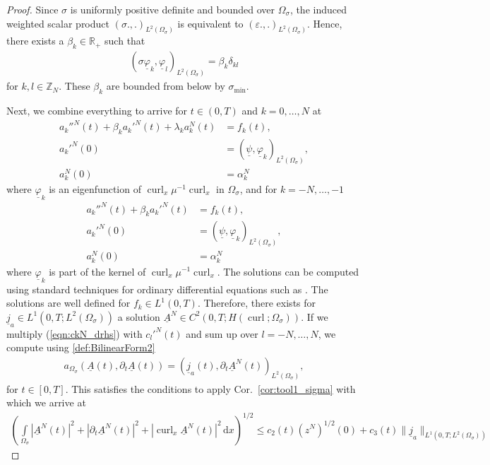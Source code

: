 \documentclass[a4paper,11pt]{article}
\newcommand{\Z}{\mathbb Z}
\newcommand{\R}{\mathbb R}
\newcommand{\omsig}{\Omega_{\sigma}}
\newcommand{\cu}{\operatorname{curl}}
\renewcommand{\vec}[1]{\underline{#1}}
\newcommand{\abs}[1]{\left\lvert{#1}\right\rvert}
\begin{document}
\begin{proof}
	Since $\sigma$ is uniformly positive definite and bounded over $\omsig$, the induced weighted scalar product $(\sigma . ,.)_{L^2(\omsig)}$ is equivalent to $(\varepsilon . ,.)_{L^2(\omsig)}$. Hence, there exists a $\beta_k\in\R_+$ such that
	\begin{align*}
		(\sigma \vec \varphi_k,\vec \varphi_l)_{L^2(\omsig)} = \beta_k \delta_{kl}
	\end{align*}
	for $k,l\in \Z_N$.	These $\beta_k$ are bounded from below by $\sigma_{\min}$.
	
	Next, we combine everything to arrive 	for $t\in (0,T)$ and $k = 0,\dots,N$ at 
	\begin{align}
		\nonumber
		 {a_k''^N}(t)+ \beta_k  {a_k'^N}(t)+ \lambda_k  {a_k^N}(t) &= f_k(t),\\
		\label{eqn:ck1}
		 {a_k'^N}(0)  &= (\vec \psi,\vec \varphi_k)_{L^2(\omsig)},\\
		\nonumber
		 {a_k^N} (0) &=\alpha_k^N
	\end{align}
	where $\vec \varphi_k$  is an eigenfunction of $\cu_x\mu^{-1}\cu_x$ in $\Omega_\sigma$, and for $k=-N,\dots,-1$
	\begin{align}
		\nonumber
		 {a_k''^N}(t)+ \beta_k  {a_k'^N}(t) &= f_k(t),\\
		\label{eqn:ck2}
		 {a_k'^N}(0) &= (\vec \psi,\vec \varphi_k)_{L^2(\omsig)},\\
		\nonumber
		 {a_k^N}(0) &= {\alpha_k^N}
	\end{align}
	where $\vec \varphi_k$  is part of the kernel of $\cu_x\mu^{-1}\cu_x$. The solutions can be computed using standard techniques for ordinary differential equations such as \cite[L.~20, L.~21]{tenenbaum1985ordinary}.  The solutions are well defined for $f_k\in L^1(0,T)$. Therefore, there exists for $\vec j_a\in L^1(0,T;L^2(\omsig))$ a solution $\vec A^N\in C^2(0,T;H(\cu;\omsig))$. If we multiply  (\ref{eqn:ckN_drhs}) with $c_l'^N(t)$ and sum up over $l=-N,\dots,N$, we compute using \eqref{def:BilinearForm2}
	\begin{align*}
		a_{\omsig}(\vec A(t) ,\partial_t \vec A(t)) =(\vec j_a(t),\partial_t\vec  A^N(t))_{L^2(\omsig)},
	\end{align*}
	for $t\in[0,T]$. This satisfies the conditions to apply Cor.~\ref{cor:tool1_sigma} with which we arrive at
	\begin{align*}
		\left(\int\limits_{\omsig}\abs{\vec A^N(t)}^2+\abs{\partial_t \vec A^N(t)}^2 +\abs{\cu_x \vec A^N(t)}^2\,\mathrm dx\right)^{1/2} \leq c_2(t) (z^{N})^{ 1/2}(0)+c_3(t) \|\vec j_a\|_{L^1(0,T;L^2(\omsig))}

\end{align*}
\end{proof}
\end{document}
